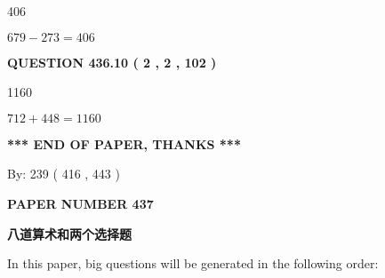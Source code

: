 \documentclass{ctexart}
\begin{document}
406
 
 
 
 
\noindent{}

$ %
679 -  %
273=   %
406$
 
 
  
\vspace{0.2in}
  
{\textbf{\Large{QUESTION
436.10 
 ( 2 , 2 , 102 )
}}}
  
  
 
 
\noindent{}

1160
 
 
 
 
\noindent{}

$ %
712 +  %
448=   %
1160$
 
 
   
   
 \vspace{0.2in}
 
   
   
   
   
\vspace{1.0in} 
{\textbf{\large{ *** END OF PAPER, THANKS *** }}} 
   
   
\hspace{1.0in} By: 
 239 ( 416 ,  443 )
   
   
   
   
\newpage 
\setcounter{page}{ 
   437001 } 
   
   
   
   
 {\textbf{ \Large{ PAPER NUMBER  437  }}}
   
   
\vspace{0.2in}
   
   
   
   
   
   
 \vspace{0.2in}
{\LARGE {\textbf{ 八道算术和两个选择题}}}
   
   
   
\vspace{0.2in}
   
In this paper, big questions will be generated in the following order: 
   
\end{document}

